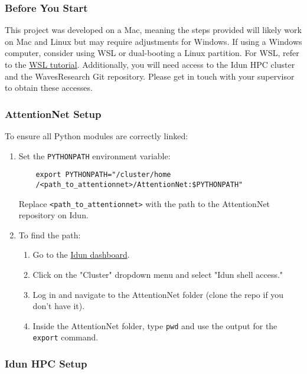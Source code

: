 \subsubsection{Before You Start}

This project was developed on a Mac, meaning the steps provided will likely work on Mac and Linux but may require adjustments for Windows. If using a Windows computer, consider using WSL or dual-booting a Linux partition. For WSL, refer to the \href{https://code.visualstudio.com/docs/remote/wsl-tutorial}{WSL tutorial}. Additionally, you will need access to the Idun HPC cluster and the WavesResearch Git repository. Please get in touch with your supervisor to obtain these accesses.

\subsubsection{AttentionNet Setup}

To ensure all Python modules are correctly linked:

\begin{enumerate}
    \item Set the \texttt{PYTHONPATH} environment variable:
    \begin{verbatim}
    export PYTHONPATH="/cluster/home
    /<path_to_attentionnet>/AttentionNet:$PYTHONPATH"
    \end{verbatim}
    Replace \texttt{<path\_to\_attentionnet>} with the path to the AttentionNet repository on Idun.

    \item To find the path:
    \begin{enumerate}
        \item Go to the \href{https://apps.hpc.ntnu.no/pun/sys/dashboard/}{Idun dashboard}.
        \item Click on the "Cluster" dropdown menu and select "Idun shell access."
        \item Log in and navigate to the AttentionNet folder (clone the repo if you don't have it).
        \item Inside the AttentionNet folder, type \texttt{pwd} and use the output for the \texttt{export} command.
    \end{enumerate}
\end{enumerate}

\subsubsection{Idun HPC Setup}

